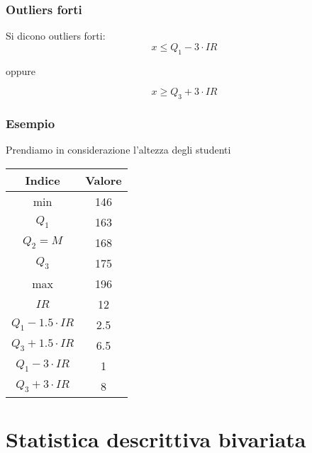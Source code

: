 \documentclass[a4paper]{article}
\theoremstyle{break}
\theoremstyle{break}
\theoremstyle{break}
\theoremstyle{break}
\begin{document}
\subsubsection{Outliers forti}
Si dicono outliers forti:
\[
	x \le Q_1 - 3 \cdot IR
\]
\begin{center}
	oppure
\end{center}
\[
	x \ge Q_3 + 3 \cdot IR
\]
\subsubsection{Esempio}
Prendiamo in considerazione l'altezza degli studenti
\begin{table}[H]
	\centering
	\begin{tabular}{|c|c|}
		\hline
		Indice                   & Valore \\
		\hline
		min                      & 146    \\
		\( Q_1 \)                & 163    \\
		\( Q_2 = M \)            & 168    \\
		\( Q_3 \)                & 175    \\
		max                      & 196    \\
		\( IR \)                 & 12     \\
		\( Q_1 - 1.5 \cdot IR \) & 2.5    \\
		\( Q_3 + 1.5 \cdot IR \) & 6.5    \\
		\( Q_1 - 3 \cdot IR \)   & 1      \\
		\( Q_3 + 3 \cdot IR \)   & 8      \\
		\hline
	\end{tabular}
\end{table}
\label{D2}

\section{Statistica descrittiva bivariata}
\end{document}
